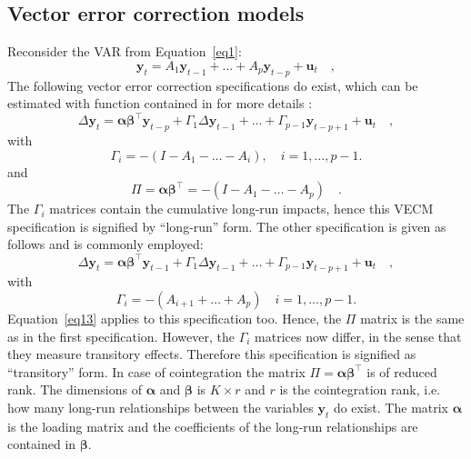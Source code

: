 \documentclass[nojss]{jss}
\begin{document}
\subsection{Vector error correction models}
\label{subsec:vecm}
Reconsider the VAR from Equation~\ref{eq1}: %
\begin{equation}
\label{eq10}
\bm{y}_t = A_1 \bm{y}_{t-1} + \ldots + A_p \bm{y}_{t-p} +
\bm{u}_t \quad , 
\end{equation}
The following vector error correction specifications do exist, which
can be estimated with function  contained in 
for more details \citep{urca}:  
\begin{equation}
\label{eq11}
\Delta \bm{y}_t = \bm{\alpha}\bm{\beta}^\top \bm{y}_{t-p} +
\Gamma_1 \Delta \bm{y}_{t-1} + \ldots + \Gamma_{p-1} \bm{y}_{t-p+1} +
\bm{u}_t \quad , 
\end{equation}
with
\begin{equation}
\label{eq12}
\Gamma_i = -(I - A_1 - \ldots - A_i), \quad i = 1, \ldots , p-1.
\end{equation}
and
\begin{equation}
\label{eq13}
\Pi = \bm{\alpha}\bm{\beta}^\top= -(I - A_1 - \ldots - A_p) \quad.
\end{equation}
The $\Gamma_i$ matrices contain the cumulative long-run impacts, hence
this VECM specification is signified by ``long-run'' form. The other
specification is given as follows and is commonly employed: 
\begin{equation}
\label{eq14}
\Delta \bm{y}_t = \bm{\alpha}\bm{\beta}^\top \bm{y}_{t-1} +
\Gamma_1 \Delta \bm{y}_{t-1} + \ldots + \Gamma_{p-1} \bm{y}_{t-p+1} +
\bm{u}_t \quad, 
\end{equation}
with
\begin{equation}
\label{eq15}
\Gamma_i = -(A_{i+1} + \ldots + A_p) \quad i = 1, \ldots, p-1.
\end{equation}
Equation~\ref{eq13} applies to this specification too. Hence, the
$\Pi$  matrix is the same as in the first specification. However, the
$\Gamma_i$ matrices now differ, in the sense that they measure
transitory effects. Therefore this specification is signified as
``transitory'' form. In case of cointegration the matrix $\Pi =
\bm{\alpha}\bm{\beta}^\top$ is of reduced rank. The dimensions of
$\bm{\alpha}$ and $\bm{\beta}$ is $K \times r$ and $r$ is the
cointegration rank, i.e. how many long-run relationships
between the variables $\bm{y}_t$ do exist. The matrix
$\bm{\alpha}$ is the loading matrix and the coefficients of the
long-run relationships are contained in $\bm{\beta}$.
 
\end{document}
